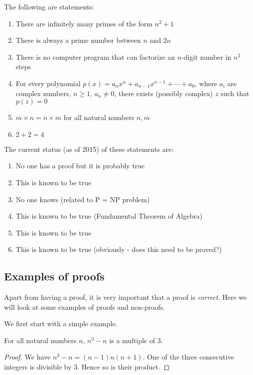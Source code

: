 \documentclass[a4paper]{article}
\begin{document}
\begin{eg}
  The following are statements:
  \begin{enumerate}
    \item There are infinitely many primes of the form $n^2 + 1$
    \item There is always a prime number between $n$ and $2n$
    \item There is no computer program that can factorize an $n$-digit number in $n^3$ steps
    \item For every polynomial $p(x) = a_nx^n + a_{n - 1}x^{n - 1} + \cdots + a_0$, where $a_i$ are complex numbers, $n\geq 1$, $a_n \not=0$, there exists (possibly complex) $z$ such that $p(z) = 0$
    \item $m\times n = n\times m$ for all natural numbers $n, m$
    \item $2 + 2 = 4$
  \end{enumerate}
  The current status (as of 2015) of these statements are:
  \begin{enumerate}
    \item No one has a proof but it is probably true
    \item This is known to be true
    \item No one knows (related to P = NP problem)
    \item This is known to be true (Fundamental Theorem of Algebra)
    \item This is known to be true
    \item This is known to be true (obviously - does this need to be proved?)
  \end{enumerate}
\end{eg}

\subsection{Examples of proofs}
Apart from having a proof, it is very important that a proof is \emph{correct}. Here we will look at some examples of proofs and non-proofs.

We first start with a simple example. 
\begin{prop}
  For all natural numbers $n$, $n^3 - n$ is a multiple of 3.
\end{prop}

\begin{proof}
  We have $n^3 - n = (n - 1)n(n + 1)$. One of the three consecutive integers is divisible by 3. Hence so is their product.
\end{proof}
\end{document}
